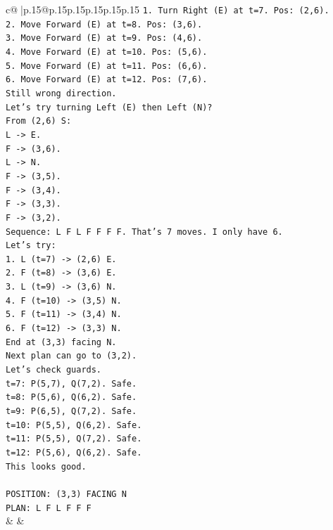 \documentclass{article}
\begin{document}
{\begin{supertabular}{c@{$\;$}|p{.15\linewidth}@{}p{.15\linewidth}p{.15\linewidth}p{.15\linewidth}p{.15\linewidth}p{.15\linewidth}}
{{{\texttt{1. Turn Right (E) at t=7. Pos: (2,6).} \\
\texttt{2. Move Forward (E) at t=8. Pos: (3,6).} \\
\texttt{3. Move Forward (E) at t=9. Pos: (4,6).} \\
\texttt{4. Move Forward (E) at t=10. Pos: (5,6).} \\
\texttt{5. Move Forward (E) at t=11. Pos: (6,6).} \\
\texttt{6. Move Forward (E) at t=12. Pos: (7,6).} \\
\texttt{Still wrong direction.} \\
\texttt{Let's try turning Left (E) then Left (N)?} \\
\texttt{From (2,6) S:} \\
\texttt{L {-}> E.} \\
\texttt{F {-}> (3,6).} \\
\texttt{L {-}> N.} \\
\texttt{F {-}> (3,5).} \\
\texttt{F {-}> (3,4).} \\
\texttt{F {-}> (3,3).} \\
\texttt{F {-}> (3,2).} \\
\texttt{Sequence: L F L F F F F. That's 7 moves. I only have 6.} \\
\texttt{Let's try:} \\
\texttt{1. L (t=7) {-}> (2,6) E.} \\
\texttt{2. F (t=8) {-}> (3,6) E.} \\
\texttt{3. L (t=9) {-}> (3,6) N.} \\
\texttt{4. F (t=10) {-}> (3,5) N.} \\
\texttt{5. F (t=11) {-}> (3,4) N.} \\
\texttt{6. F (t=12) {-}> (3,3) N.} \\
\texttt{End at (3,3) facing N.} \\
\texttt{Next plan can go to (3,2).} \\
\texttt{Let's check guards.} \\
\texttt{t=7: P(5,7), Q(7,2). Safe.} \\
\texttt{t=8: P(5,6), Q(6,2). Safe.} \\
\texttt{t=9: P(6,5), Q(7,2). Safe.} \\
\texttt{t=10: P(5,5), Q(6,2). Safe.} \\
\texttt{t=11: P(5,5), Q(7,2). Safe.} \\
\texttt{t=12: P(5,6), Q(6,2). Safe.} \\
\texttt{This looks good.} \\
\\ 
\texttt{POSITION: (3,3) FACING N} \\
\texttt{PLAN: L F L F F F} \\
            }
        }
    }
    & & \\ \\


\end{supertabular}}
\end{document}
